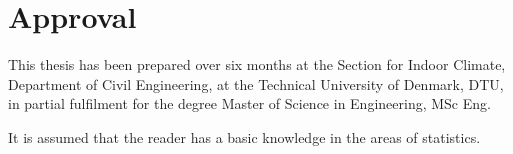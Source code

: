 \section*{Approval}
This thesis has been prepared over six months at the Section for Indoor Climate, Department of Civil Engineering, at the Technical University of Denmark, DTU, in partial fulfilment for the degree Master of Science in Engineering, MSc Eng. 

It is assumed that the reader has a basic knowledge in the areas of statistics. 

\vfill

\begin{center}
\end{center}

\vfill

